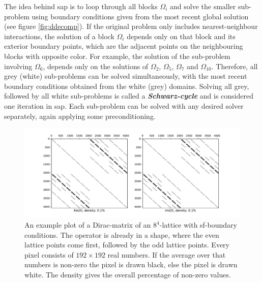 \documentclass{article}
\theoremstyle{plain} %
\theoremstyle{convention} %
\theoremstyle{remark} %
\def\df#1{\textbf{\textit{#1}}}
\numberwithin{equation}{section}
\begin{document}
The idea behind \acrlong{sap} is to loop through all blocks $\Omega_i$ and solve the smaller sub-problem using boundary conditions given from the most recent global solution (see figure \ref{fig:ddecomp}). If the original problem only includes nearest-neighbour interactions, the solution of a block $\Omega_i$ depends only on that block and its exterior boundary points, which are the adjacent points on the neighbouring blocks with opposite color. For example, the solution of the sub-problem involving $\Omega_6$, depends only on the solutions of $\Omega_2$, $\Omega_5$, $\Omega_7$ and $\Omega_{10}$\footnotemark.
Therefore, all grey (white) sub-problems can be solved simultaneously, with the most recent boundary conditions obtained from the white (grey) domains. Solving all grey, followed by all white sub-problems is called a \df{Schwarz-cycle} and is considered one iteration in \acrshort{sap}. Each sub-problem can be solved with any desired solver separately, again applying some preconditioning\footnotemark.

\begin{figure}[h]
    \centering
    \includegraphics[width=1.0\textwidth]{plots/dirac_matrix6}
    \caption{An example plot of a Dirac-matrix of an $8^4$-lattice with \acrshort{sf}-boundary conditions. The operator is already in a shape, where the even lattice points come first, followed by the odd lattice points. Every pixel consists of $192 \times 192$ real numbers. If the average over that numbers is non-zero the pixel is drawn black, else the pixel is drawn white. The density gives the overall percentage of non-zero values.}
    \label{fig:dirac_matrix}
\end{figure}
\end{document}
